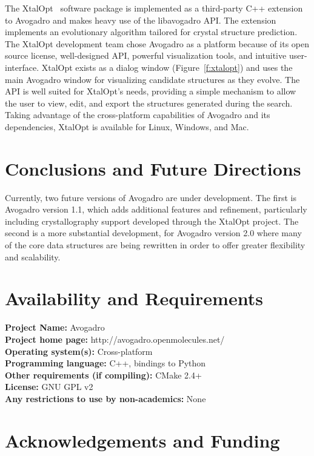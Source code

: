 \documentclass[10pt]{bmc_article}
\newenvironment{bmcformat}{\begin{raggedright}
\baselineskip20pt\sloppy\setboolean{publ}{false}}{\end{raggedright}
\baselineskip20pt\sloppy}
\begin{document}
\begin{bmcformat}
The XtalOpt~\cite{xo1, xo2} software package is implemented as a third-party C++
extension to Avogadro and makes heavy use of the libavogadro API. The extension
implements an evolutionary algorithm tailored for crystal structure prediction.
The XtalOpt development team chose Avogadro as a platform because of its
open source license, well-designed API, powerful visualization tools, and
intuitive user-interface. XtalOpt exists as a dialog window
(Figure~\ref{f:xtalopt}) and uses the main Avogadro window for visualizing
candidate structures as they evolve. The API is well suited for XtalOpt’s needs,
providing a simple mechanism to allow the user to view, edit, and export the
structures generated during the search. Taking advantage of the cross-platform
capabilities of Avogadro and its dependencies, XtalOpt is available for Linux,
Windows, and Mac.

\section{Conclusions and Future Directions}

Currently, two future versions of Avogadro are under development. The
first is Avogadro version 1.1, which adds additional features and
refinement, particularly including crystallography support developed
through the XtalOpt project. The second is a more substantial
development, for Avogadro version 2.0 where many of the core data
structures are being rewritten in order to offer greater flexibility and
scalability.




\section{Availability and Requirements}

\textbf{Project Name:} Avogadro \\
\textbf{Project home page:} http://avogadro.openmolecules.net/ \\
\textbf{Operating system(s):} Cross-platform \\
\textbf{Programming language:} C++, bindings to Python \\
\textbf{Other requirements (if compiling):} CMake 2.4+ \\
\textbf{License:} GNU GPL v2 \\
\textbf{Any restrictions to use by non-academics:} None

\section{Acknowledgements and Funding}


\end{bmcformat}
\end{document}
